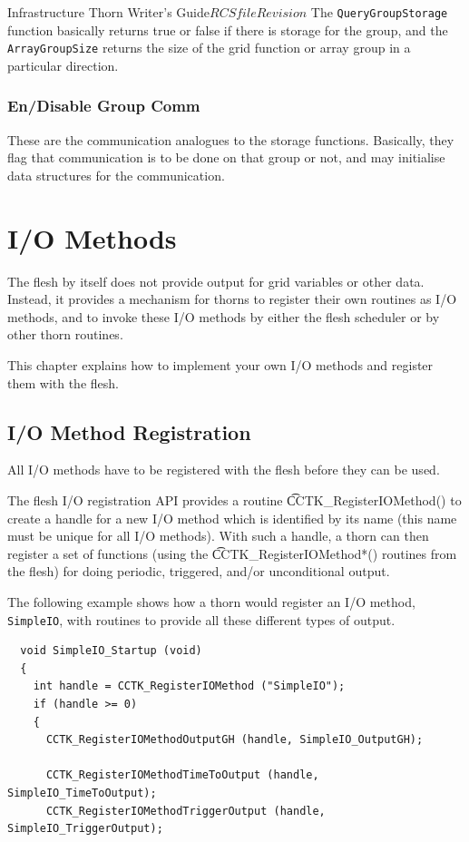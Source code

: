 \begin{cactuspart}{Infrastructure Thorn Writer's Guide}{$RCSfile$}{$Revision$}
The {\tt QueryGroupStorage} function basically returns true or false if
there is storage for the group, and the {\tt ArrayGroupSize} returns the
size of the grid function or array group in a particular direction.

\subsection{En/Disable Group Comm}

These are the communication analogues to the storage functions.  Basically,
they flag that communication is to be done on that group or not, and may
initialise data structures for the communication.


\chapter{I/O Methods}
\label{chap:io_methods}
%
The flesh by itself does not provide output for grid variables or other data.
Instead, it provides a mechanism for thorns to register their own
routines as I/O methods, and to invoke these I/O methods by either the
flesh scheduler or by other thorn routines.

This chapter explains how to implement your own I/O methods and register
them with the flesh.
%
\section{I/O Method Registration}
%
All I/O methods have to be registered with the flesh before they can be used.

The flesh I/O registration API provides a routine {\t CCTK\_RegisterIOMethod()}
to create a handle for a new I/O method which is identified by its name
(this name must be unique for all I/O methods).
With such a handle, a thorn can then register a set of functions (using the
{\t CCTK\_RegisterIOMethod*()} routines from the flesh) for doing
periodic, triggered, and/or unconditional output.

The following example shows how a thorn would register an I/O method,
{\tt SimpleIO}, with routines to provide all these different types of output.
%
\begin{verbatim}
  void SimpleIO_Startup (void)
  {
    int handle = CCTK_RegisterIOMethod ("SimpleIO");
    if (handle >= 0)
    {
      CCTK_RegisterIOMethodOutputGH (handle, SimpleIO_OutputGH);

      CCTK_RegisterIOMethodTimeToOutput (handle, SimpleIO_TimeToOutput);
      CCTK_RegisterIOMethodTriggerOutput (handle, SimpleIO_TriggerOutput);


\end{verbatim}
\end{cactuspart}
